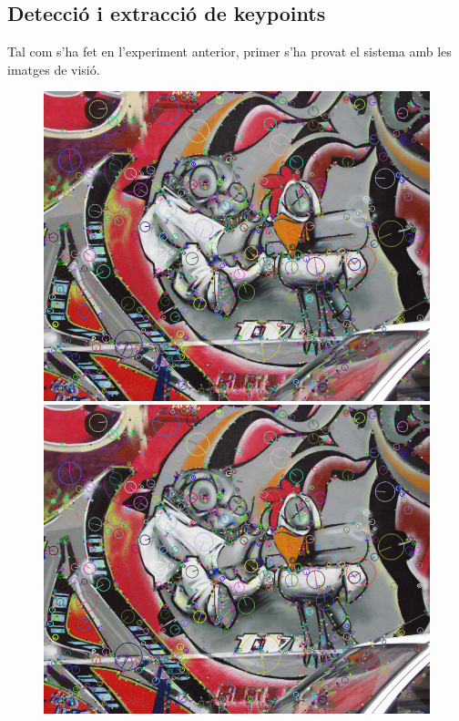 	\subsection{Detecció i extracció de keypoints}
		Tal com s'ha fet en l'experiment anterior, primer s'ha provat el sistema amb les imatges de visió.

		\begin{figure}[!htb]
				\includegraphics[width=\linewidth]{images/RobotKp}
				\label{fig:awesome_image1}
			\endminipage\hfill
				\includegraphics[width=\linewidth]{images/RobotKp}

\end{figure}
